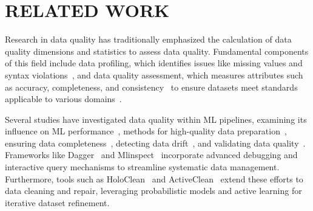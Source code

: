 \section{RELATED WORK}
\label{sec:relatedwork}
Research in data quality has traditionally emphasized the calculation of data quality dimensions and statistics to assess data quality. Fundamental components of this field include data profiling, which identifies issues like missing values and syntax violations~\cite{chiang2008discovering, ilyas2015trends, razniewski2011completeness}, and data quality assessment, which measures attributes such as accuracy, completeness, and consistency~\cite{DBLP:journals/jmis/WangS96, sidi2012data} to ensure datasets meet standards applicable to various domains~\cite{jayawardene2013curse, jayawardene2015analysis, YEGANEH201424}. 



Several studies have investigated data quality within ML pipelines, examining its influence on ML performance~\cite{Budach2022TheEO}, methods for high-quality data preparation~\cite{gupta2021data, Foroni2021EstimatingTE}, ensuring data completeness~\cite{karlavs2020nearest, schelter2020learning}, detecting data drift~\cite{tahmasbi2020driftsurf,concept-drift-96,dong2024efficiently}, and validating data quality~\cite{fadlallah2023context,sinthong2021dqdf,schelter2018automating,caveness2020tensorflow}. Frameworks like Dagger~\cite{rezig2020dagger} and Mlinspect~\cite{grafberger2021mlinspect} incorporate advanced debugging and interactive query mechanisms to streamline systematic data management. Furthermore, tools such as HoloClean~\cite{rekatsinas2017holoclean} and ActiveClean~\cite{krishnan2016activeclean} extend these efforts to data cleaning and repair, leveraging probabilistic models and active learning for iterative dataset refinement.

